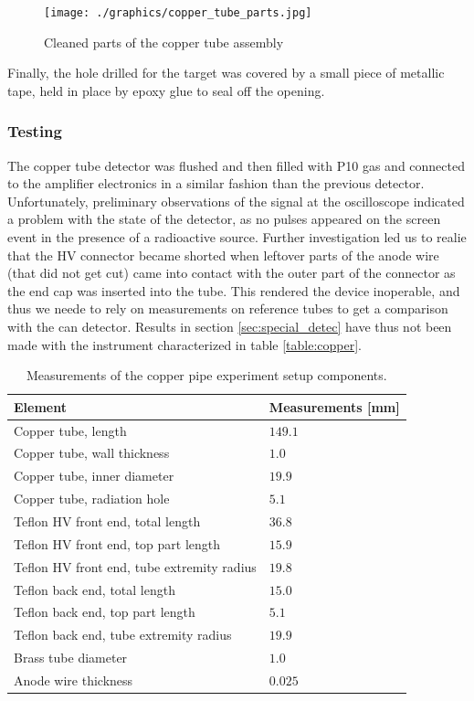 \begin{figure}[h]
  \centering
  \texttt{[image: ./graphics/copper\_tube\_parts.jpg]}
  \caption{Cleaned parts of the copper tube assembly}
  \label{fig:copper_parts}
\end{figure}

Finally, the hole drilled for the target was covered by a small piece of metallic tape, held in place by epoxy glue to seal off the opening.

\subsubsection{Testing}

The copper tube detector was flushed and then filled with P10 gas and connected to the amplifier electronics in a similar fashion than the previous detector. Unfortunately, preliminary observations of the signal at the oscilloscope indicated a problem with the state of the detector, as no pulses appeared on the screen event in the presence of a radioactive source. Further investigation led us to realie that the HV connector became shorted when leftover parts of the anode wire (that did not get cut) came into contact with the outer part of the connector as the end cap was inserted into the tube. This rendered the device inoperable, and thus we neede to rely on measurements on reference tubes to get a comparison with the can detector. Results in section \ref{sec:special_detec} have thus not been made with the instrument characterized in table \ref{table:copper}.

\begin{table}[H]
	\begin{tabularx}{\linewidth}{p{7cm}|X}
		\textbf{Element} & \textbf{Measurements} {[}mm{]}     \\ \hline
		Copper tube, length                        & $149.1$  \\
		Copper tube, wall thickness                & $1.0$   \\
		Copper tube, inner diameter                & $19.9$   \\
		Copper tube, radiation hole                & $5.1$   \\
		Teflon HV front end,  total length         & $36.8$  \\
		Teflon HV front end, top part length       & $15.9$  \\
		Teflon HV front end, tube extremity radius & $19.8$  \\
		Teflon back end, total length              & $15.0$  \\
		Teflon back end, top part length           & $5.1$   \\
		Teflon back end, tube extremity radius     & $19.9$  \\
		Brass tube diameter                        & $1.0$    \\
		Anode wire thickness                       & $0.025$  \\
                \hline
	\end{tabularx}
\caption{Measurements of the copper pipe experiment setup components.}
\label{Tab:coppercan_sizes}
\end{table}
